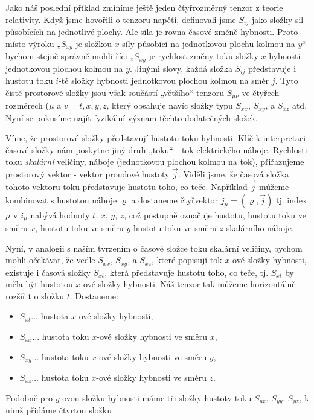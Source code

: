 {    Jako náš poslední příklad zmíníme ještě jeden čtyřrozměrný tenzor z teorie relativity. Když jsme
    hovořili o tenzoru napětí, definovali jsme \(S_{ij}\) jako složky sil působících na jednotlivé
    plochy. Ale síla je rovna časové změně hybnosti. Proto místo výroku „\(S_{xy}\) je složkou \(x\)
    síly působící na jednotkovou plochu kolmou na \(y\)“ bychom stejně správně mohli říci
    „\(S_{xy}\) je rychlost změny toku složky \(x\) hybnosti jednotkovou plochou kolmou na \(y\).
    Jinými slovy, každá složka \(S_{ij}\) představuje i hustotu toku \(i\)-té složky hybnosti
    jednotkovou plochou kolmou na směr \(j\). Tyto čistě prostorové složky jsou však součástí
    „většího“ tenzoru \(S_{\mu\nu}\) ve čtyřech rozměrech (\(\mu\) a \(v= t, x,y,z\), který obsahuje
    navíc složky typu \(S_{xx}\), \(S_{xy}\), a \(S_{xz}\) atd. Nyní se pokusíme najít fyzikální
    význam těchto dodatečných složek.
    
    Víme, že prostorové složky představují hustotu toku hybnosti. Klíč k interpretaci časové složky
    nám poskytne jiný druh „toku“ - tok elektrického náboje. Rychlosti toku \emph{skalární}
    veličiny, náboje (jednotkovou plochou kolmou na tok), přiřazujeme prostorový vektor - vektor
    proudové hustoty \(\vec{j}\). Viděli jsme, že časová složka tohoto vektoru toku představuje
    hustotu toho, co teče. Například \(\vec{j}\) můžeme kombinovat s hustotou náboje \(\varrho\) a
    dostaneme čtyřvektor \(j_\mu=(\varrho,\vec{j})\) tj. index \(\mu\) v \(i_\mu\) nabývá hodnoty
    \(t\), \(x\), \(y\), \(z\), což postupně označuje hustotu, hustotu toku ve směru \(x\), hustotu
    toku ve směru \(y\) hustotu toku ve směru \(z\) skalárního náboje.
    
    Nyní, v analogii s naším tvrzením o časové složce toku skalární veličiny, bychom mohli očekávat,
    že vedle \(S_{xx}\), \(S_{xy}\), a \(S_{xz}\), které popisují tok \(x\)-ové složky hybnosti,
    existuje i časová složky \(S_{xt}\), která představuje hustotu toho, co teče, tj. \(S_{xt}\) by
    měla být hustotou \(x\)-ové složky hybnosti. Náš tenzor tak můžeme horizontálně rozšířit o
    složku \(t\). Dostaneme:
    \begin{itemize}[noitemsep]
      \item \(S_{xt}\ldots\) hustota \(x\)-ové složky hybnosti,
      \item \(S_{xx}\ldots\) hustota toku \(x\)-ové složky hybnosti ve směru \(x\),
      \item \(S_{xy}\ldots\) hustota toku \(x\)-ové složky hybnosti ve směru \(y\),
      \item \(S_{xz}\ldots\) hustota toku \(x\)-ové složky hybnosti ve směru \(z\).
    \end{itemize}
    Podobně pro \(y\)-ovou složku hybnosti máme tři složky hustoty toku \(S_{yx}\), \(S_{yy}\),
    \(S_{yz}\), k nimž přidáme čtvrtou složku
    
}
